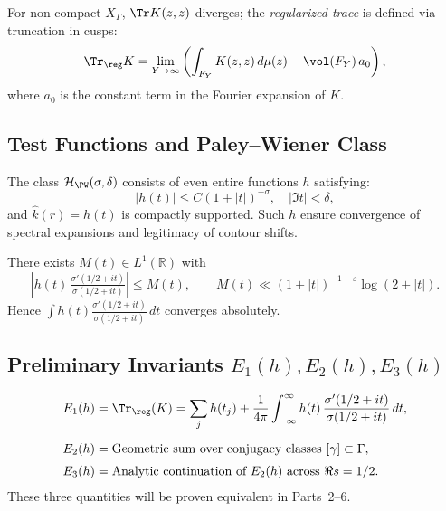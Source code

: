 \begin{remark}\label{rem:regularization}\relax
For non-compact $X_\Gamma$, $\Tr K(z,z)$ diverges; the \emph{regularized trace} is defined via truncation in cusps:
\[
\Tr_\reg K=\lim_{Y\to\infty}\left(\int_{F_Y}K(z,z)\,d\mu(z)-\vol(F_Y)\,a_0\right),
\]
where $a_0$ is the constant term in the Fourier expansion of $K$. %
\end{remark}

\subsection{Test Functions and Paley--Wiener Class}\relax\hspace{0pt}
\label{subsec:testfunctions}\relax\hspace{0pt}

\begin{definition}\label{def:testfunc}\relax
The class $\mathcal{H}_{\PW}(\sigma,\delta)$ consists of even entire functions $h$ satisfying:
\[
|h(t)|\le C(1+|t|)^{-\sigma},\quad |\Im t|<\delta,
\]
and $\widehat{k}(r)=h(t)$ is compactly supported.  
Such $h$ ensure convergence of spectral expansions and legitimacy of contour shifts. %
\end{definition}

\begin{lemma}\label{lem:pw-majorant}\relax
There exists $M(t)\in L^1(\mathbb{R})$ with
\[
|h(t)\,\tfrac{\sigma'(1/2+it)}{\sigma(1/2+it)}|\le M(t),\qquad M(t)\ll (1+|t|)^{-1-\varepsilon}\log(2+|t|).
\]
Hence $\int h(t)\frac{\sigma'(1/2+it)}{\sigma(1/2+it)}\,dt$ converges absolutely. %
\end{lemma}

\subsection{Preliminary Invariants $E_1(h),E_2(h),E_3(h)$}\relax\hspace{0pt}
\label{subsec:prelim-E123}\relax\hspace{0pt}

\begin{definition}\label{def:E123}\relax
\[
\begin{aligned}
E_1(h)&=\Tr_\reg(K)=\sum_j h(t_j)+\frac{1}{4\pi}\int_{-\infty}^\infty h(t)\,\frac{\sigma'(1/2+it)}{\sigma(1/2+it)}\,dt,\\[2mm]
E_2(h)&=\text{Geometric sum over conjugacy classes }[\gamma]\subset\Gamma,\\[1mm]
E_3(h)&=\text{Analytic continuation of }E_2(h)\text{ across }\Re s=1/2.
\end{aligned}
\]
These three quantities will be proven equivalent in Parts~2–6. %
\end{definition}

